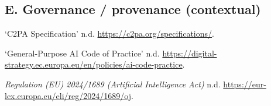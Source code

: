 \documentclass{ZGJournalArticle_2026}
\newlength{\cslhangindent}
\newenvironment{CSLReferences}[2] %
 {\begin{list}{}{%
  \sloppy
  \setlength{\itemindent}{0pt}
  \setlength{\leftmargin}{0pt}
  \setlength{\parsep}{0pt}
  \ifodd #1
   \setlength{\leftmargin}{\cslhangindent}
   \setlength{\itemindent}{-1\cslhangindent}
  \fi
  \setlength{\itemsep}{#2\baselineskip}}}
 {\end{list}}
\begin{document}
\subsection*{E. Governance / provenance (contextual)}
\begin{CSLReferences}{1}{0}
\hypertarget{ref-c2paSpec}{}
{`C2PA Specification'} n.d. \url{https://c2pa.org/specifications/}.

\hypertarget{ref-euCodeOfPracticeGpai}{}

{`General-Purpose AI Code of Practice'} n.d.
\url{https://digital-strategy.ec.europa.eu/en/policies/ai-code-practice}.

\hypertarget{ref-euAiAct}{}

\emph{Regulation (EU) 2024/1689 (Artificial Intelligence Act)} n.d.
\url{https://eur-lex.europa.eu/eli/reg/2024/1689/oj}.

\end{CSLReferences}
\end{document}
